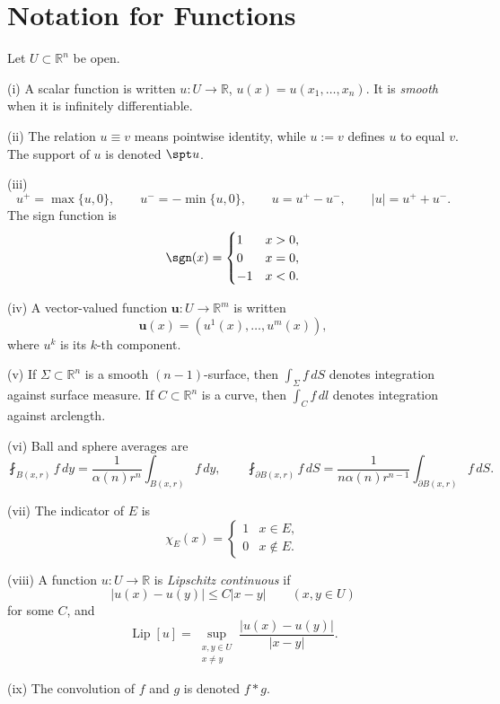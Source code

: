 \section{Notation for Functions}
\label{sec:notation-for-functions}

\begin{definition}
\label{def:function-notation-basic}
Let $U\subset\mathbb R^n$ be open.

(i) A scalar function is written $u:U\to\mathbb R$, $u(x)=u(x_1,\ldots,x_n)$. It is \textit{smooth} when it is infinitely differentiable.

(ii) The relation $u\equiv v$ means pointwise identity, while $u:=v$ defines $u$ to equal $v$. The support of $u$ is denoted $\spt u$.

(iii)
\[
u^+=\max\{u,0\},
\qquad
u^-=-\min\{u,0\},
\qquad
u=u^+-u^-,
\qquad
|u|=u^++u^-.
\]
The sign function is
\[
\sgn(x)=
\begin{cases}
1 & x>0,\\
0 & x=0,\\
-1 & x<0.
\end{cases}
\]

(iv) A vector-valued function $\mathbf u:U\to\mathbb R^m$ is written
\[
\mathbf u(x)=(u^1(x),\ldots,u^m(x)),
\]
where $u^k$ is its $k$-th component.

(v) If $\Sigma\subset\mathbb R^n$ is a smooth $(n-1)$-surface, then $\int_\Sigma f\,dS$ denotes integration against surface measure. If $C\subset\mathbb R^n$ is a curve, then $\int_C f\,dl$ denotes integration against arclength.

(vi) Ball and sphere averages are
\[
\fint_{B(x,r)}f\,dy
=\frac{1}{\alpha(n)r^n}\int_{B(x,r)}f\,dy,
\qquad
\fint_{\partial B(x,r)}f\,dS
=\frac{1}{n\alpha(n)r^{n-1}}\int_{\partial B(x,r)}f\,dS.
\]

(vii) The indicator of $E$ is
\[
\chi_E(x)=
\begin{cases}
1 & x\in E,\\
0 & x\notin E.
\end{cases}
\]

(viii) A function $u:U\to\mathbb R$ is \textit{Lipschitz continuous} if
\[
|u(x)-u(y)|\leq C|x-y|\qquad(x,y\in U)
\]
for some $C$, and
\[
\operatorname{Lip}[u]
=\sup_{\substack{x,y\in U\\x\ne y}}
\frac{|u(x)-u(y)|}{|x-y|}.
\]

(ix) The convolution of $f$ and $g$ is denoted $f*g$.
\end{definition}

